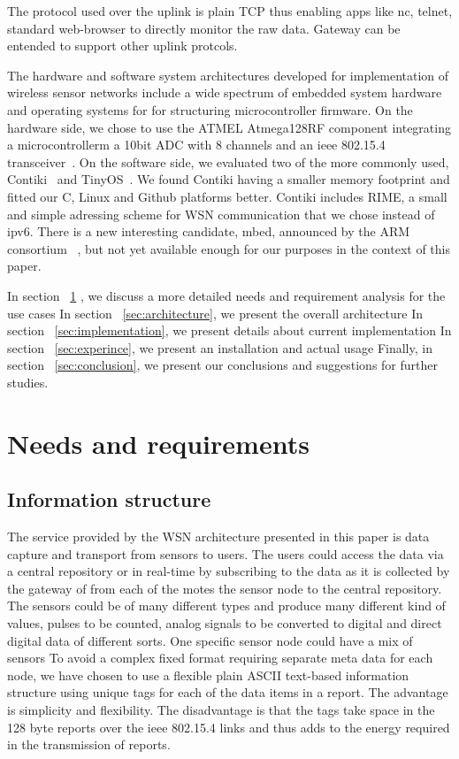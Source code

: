 \documentclass[conference, a4paper,10pt,twocolumn]{IEEEtran}
\begin{document}
The protocol used over the uplink is plain TCP thus enabling apps like 
nc, telnet, standard web-browser to directly monitor the raw data.
Gateway can be entended to support other uplink protcols.

The hardware and software system architectures developed for 
implementation of wireless sensor networks include a wide spectrum of 
embedded system hardware and operating systems for for structuring 
microcontroller firmware.
On the hardware side, we chose to use the ATMEL Atmega128RF component 
integrating a microcontrollerm a 10bit ADC with 8 channels and an ieee 
802.15.4 transceiver~\cite{ATMEGA}.
On the software side, we evaluated two of the more commonly used, 
Contiki~\cite{CONTIKI} and TinyOS~\cite{tinyos}. We found Contiki having 
a smaller memory footprint and fitted our C, Linux and Github platforms 
better. Contiki includes RIME, a small and simple adressing scheme for 
WSN communication that we chose instead of ipv6. There is a new 
interesting candidate, mbed, announced by the ARM consortium 
~\cite{mbed}, but not yet available enough for our purposes in the 
context of this paper.


In section ~\ref{sec:needs} , we discuss a more detailed needs and requirement analysis for the use cases
In section ~\ref{sec:architecture}, we present the overall architecture
In section ~\ref{sec:implementation}, we present details about current implementation  
In section ~\ref{sec:experince}, we present an installation and actual usage
Finally, in section ~\ref{sec:conclusion}, we present our conclusions and suggestions for further studies.
\section{Needs and requirements}
\label{sec:needs}


\subsection{Information structure}


The service provided by the WSN architecture presented in this paper is 
data capture and transport from sensors to users. The users could access 
the data via a central repository or in real-time by subscribing to the 
data as it is collected by the gateway of from each of the motes the 
sensor node to the central repository.
The sensors could be of many different types and produce many different 
kind of values, pulses to be counted, analog signals to be converted to 
digital and direct digital data of different sorts. One specific sensor 
node could have a mix of sensors
To avoid a complex fixed format requiring separate meta data for each 
node, we have chosen to use a flexible plain ASCII text-based 
information structure using unique tags for each of the data items in a 
report. The advantage is simplicity and flexibility. The disadvantage is 
that the tags take space in the 128 byte reports over the ieee 802.15.4 
links and thus adds to the energy required in the transmission of reports.
\end{document}
